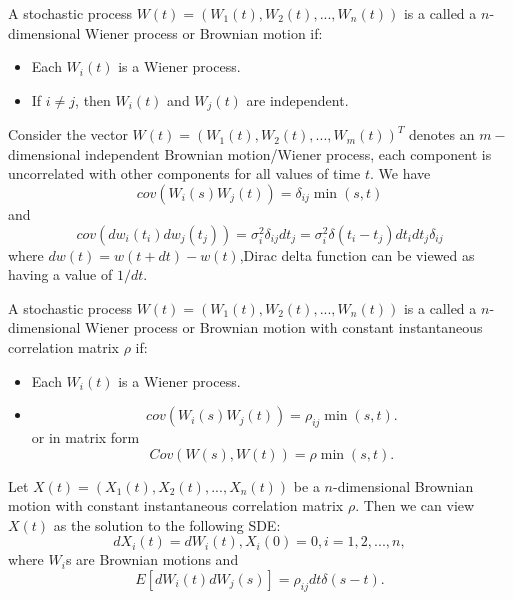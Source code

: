 \begin{refsection}
\begin{definition} 
	A stochastic process $W(t)=(W_1(t),W_2(t),...,W_n(t))$ is a called a $n$-dimensional Wiener process or Brownian motion if:
	\begin{itemize}
		\item Each $W_i(t)$ is a Wiener process.
		\item If $i\neq j$, then $W_i(t)$ and $W_j(t)$ are independent.
	\end{itemize}
\end{definition}


\begin{lemma}
	Consider the vector $W(t) = (W_1(t),W_2(t),...,W_m(t))^T$ denotes an $m-$dimensional independent Brownian motion/Wiener process, each component is uncorrelated with other components for all values of time $t$. We have
	$$cov(W_i(s)W_j(t))=\delta_{ij}\min(s,t)$$ and
	$$cov(dw_i(t_i) dw_j(t_j))=\sigma^2_i\delta_{ij}dt_j=\sigma^2_i \delta(t_i-t_j)dt_idt_j\delta_{ij}$$ where $dw(t)=w(t+dt)-w(t)$,Dirac delta function can be viewed as having a value of $1/dt$.	
\end{lemma}

\begin{definition} \label{ch:theory-of-stochastic-process:def:MultiDimensionalCorrelationBrownianMotion}
	A stochastic process $W(t)=(W_1(t),W_2(t),...,W_n(t))$ is a called a $n$-dimensional Wiener process or Brownian motion with constant instantaneous correlation matrix $\rho$ if:
	\begin{itemize}
		\item Each $W_i(t)$ is a Wiener process.
		\item $$cov(W_i(s)W_j(t))=\rho_{ij}\min(s,t).$$
		or in matrix form $$Cov(W(s),W(t)) = \rho \min(s,t).$$
	\end{itemize}
\end{definition}

\begin{remark}
	Let $X(t)=(X_1(t),X_2(t),...,X_n(t))$ be a $n$-dimensional Brownian motion with constant instantaneous correlation matrix $\rho$. Then we can view $X(t)$ as the solution to the following SDE:
	$$dX_i(t) = dW_i(t), X_i(0) = 0, i=1,2,...,n,$$
	where $W_i$s are Brownian motions and 
	$$E[dW_i(t)dW_j(s)] = \rho_{ij}dt \delta(s-t).$$ 
\end{remark}


\end{refsection}
